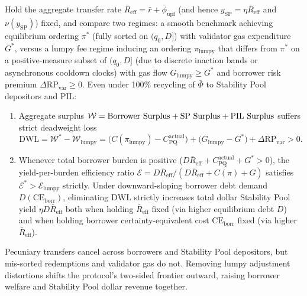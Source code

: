 \begin{proposition}\label{prop:recycling}
Hold the aggregate transfer rate $\bar{R}_{\mathrm{eff}} = \bar{r} + \bar{\phi}_{\mathrm{upf}}$ (and hence $y_{\mathrm{SP}} = \eta \bar{R}_{\mathrm{eff}}$ and $\nu(y_{\mathrm{SP}})$) fixed, and compare two regimes: a smooth benchmark achieving equilibrium ordering $\pi^*$ (fully sorted on $(q_0, D]$) with validator gas expenditure $G^*$, versus a lumpy fee regime inducing an ordering $\pi_{\mathrm{lumpy}}$ that differs from $\pi^*$ on a positive-measure subset of $(q_0, D]$ (due to discrete inaction bands or asynchronous cooldown clocks) with gas flow $G_{\mathrm{lumpy}} \ge G^*$ and borrower risk premium $\Delta\mathrm{RP}_{\mathrm{var}} \ge 0$. Even under 100\% recycling of $\bar{\Phi}$ to Stability Pool depositors and PIL:
\begin{enumerate}[label=(\roman*), leftmargin=2.2em, itemsep=2pt]
\item Aggregate surplus $\mathcal{W} = \textup{Borrower Surplus} + \textup{SP Surplus} + \textup{PIL Surplus}$ suffers strict deadweight loss
\begin{equation}\label{eq:dwl_recycling}
\mathrm{DWL} = \mathcal{W}^* - \mathcal{W}_{\mathrm{lumpy}} = \bigl(C(\pi_{\mathrm{lumpy}}) - C_{\mathrm{PQ}}^{\mathrm{actual}}\bigr) + \bigl(G_{\mathrm{lumpy}} - G^*\bigr) + \Delta\mathrm{RP}_{\mathrm{var}} > 0.
\end{equation}
\item Whenever total borrower burden is positive ($D\bar{R}_{\mathrm{eff}} + C_{\mathrm{PQ}}^{\mathrm{actual}} + G^* > 0$), the yield-per-burden efficiency ratio $\mathcal{E} = D\bar{R}_{\mathrm{eff}} / (D\bar{R}_{\mathrm{eff}} + C(\pi) + G)$ satisfies $\mathcal{E}^* > \mathcal{E}_{\mathrm{lumpy}}$ strictly. Under downward-sloping borrower debt demand $D(\mathrm{CE}_{\mathrm{borr}})$, eliminating $\mathrm{DWL}$ strictly increases total dollar Stability Pool yield $\eta D \bar{R}_{\mathrm{eff}}$ both when holding $\bar{R}_{\mathrm{eff}}$ fixed (via higher equilibrium debt $D$) and when holding borrower certainty-equivalent cost $\mathrm{CE}_{\mathrm{borr}}$ fixed (via higher $\bar{R}_{\mathrm{eff}}$).
\end{enumerate}
\end{proposition}

Pecuniary transfers cancel across borrowers and Stability Pool depositors, but mis-sorted redemptions and validator gas do not. Removing lumpy adjustment distortions shifts the protocol's two-sided frontier outward, raising borrower welfare and Stability Pool dollar revenue together.

